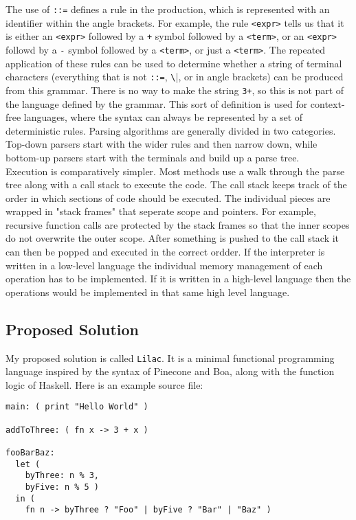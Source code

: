 \documentclass[a4paper, 12pt]{article}
\begin{document}
The use of \verb|::=| defines a rule in the production, which is represented with an identifier within the angle brackets. For example, the rule \verb|<expr>| tells us that it is either an \verb|<expr>| followed by a \verb|+| symbol followed by a \verb|<term>|, or an \verb|<expr>| followd by a \verb|-| symbol followed by a \verb|<term>|, or just a \verb|<term>|. The repeated application of these rules can be used to determine whether a string of terminal characters (everything that is not \verb|::=|, \verb|\||, or in angle brackets) can be produced from this grammar. There is no way to make the string \verb|3+|, so this is not part of the language defined by the grammar. This sort of definition is used for context-free languages, where the syntax can always be represented by a set of deterministic rules. Parsing algorithms are generally divided in two categories. Top-down parsers start with the wider rules and then narrow down, while bottom-up parsers start with the terminals and build up a parse tree.\\

Execution is comparatively simpler. Most methods use a walk through the parse tree along with a call stack to execute the code. The call stack keeps track of the order in which sections of code should be executed. The individual pieces are wrapped in "stack frames" that seperate scope and pointers. For example, recursive function calls are protected by the stack frames so that the inner scopes do not overwrite the outer scope. After something is pushed to the call stack it can then be popped and executed in the correct ordder. If the interpreter is written in a low-level language the individual memory management of each operation has to be implemented. If it is written in a high-level language then the operations would be implemented in that same high level language.\\

\subsection{Proposed Solution}\label{sec:proposed-solution}

My proposed solution is called \verb|Lilac|. It is a minimal functional programming language inspired by the syntax of Pinecone and Boa, along with the function logic of Haskell. Here is an example source file:\\
\begin{verbatim}
main: ( print "Hello World" )

addToThree: ( fn x -> 3 + x )

fooBarBaz:
  let (
    byThree: n % 3,
    byFive: n % 5 )
  in (
    fn n -> byThree ? "Foo" | byFive ? "Bar" | "Baz" )
\end{verbatim}
\end{document}
